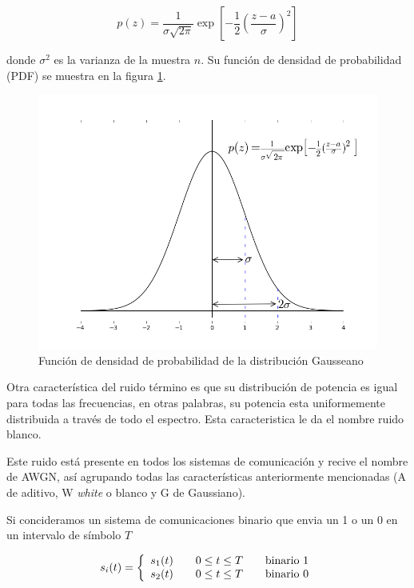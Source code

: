\begin{equation}\label{eq:gauss}
p(z)=\frac{1}{\sigma\sqrt{2\pi}}\exp\left[-\frac{1}{2}\left(\frac{z-a}{\sigma}\right)^2\right]
\end{equation}

donde $\sigma^2$ es la varianza de la muestra $n$. Su funci\'on de densidad de probabilidad (PDF) se
muestra en la figura \ref{fig:gauss}.

\begin{figure}[ht]
\centering
	\includegraphics[width=5.5in]{figs/gauss}
	\caption{Funci\'on de densidad de probabilidad de la distribuci\'on Gausseano}
	\label{fig:gauss}
\end{figure}

Otra caracter\'istica del ruido t\'ermino es que su distribuci\'on de potencia es igual para
todas las frecuencias, en otras palabras, su potencia esta uniformemente distribuida a trav\'es de
todo el espectro. Esta caracteristica le da el nombre ruido blanco.

Este ruido est\'a presente en todos los sistemas de comunicaci\'on y recive el nombre de AWGN, as\'i
agrupando todas las caracter\'isticas anteriormente mencionadas (A de aditivo, W \emph{white} o
blanco y G de Gaussiano).

Si concideramos un sistema de comunicaciones binario que envia un 1 o un 0 en un intervalo de
s\'imbolo $T$

\begin{equation}\label{eq:binarycom}
s_i(t)=\left\{
\begin{array}{l l l}
s_1(t) & \quad 0\leq t \leq T & \quad \mbox{binario 1}\\
s_2(t) & \quad 0\leq t \leq T & \quad \mbox{binario 0}\\
\end{array}\right.
\end{equation}

